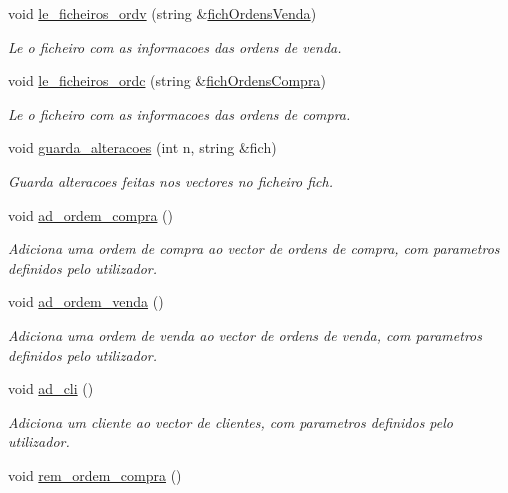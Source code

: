 \begin{DoxyCompactItemize}
void \hyperlink{class_bolsa_ab0cd2fab3d7490d5d4a431e5cb1106e6}{le\+\_\+ficheiros\+\_\+ordv} (string \&\hyperlink{_utils_8h_ad22902af7efe6d185550055b7caa5cbb}{fich\+Ordens\+Venda})
\begin{DoxyCompactList}\small\item\em Le o ficheiro com as informacoes das ordens de venda. \end{DoxyCompactList}\item 
void \hyperlink{class_bolsa_a57e3864eac22b2690e04fb8be39b5e58}{le\+\_\+ficheiros\+\_\+ordc} (string \&\hyperlink{_utils_8h_acaee3ba642d3be244820a97e5eb5b7f7}{fich\+Ordens\+Compra})
\begin{DoxyCompactList}\small\item\em Le o ficheiro com as informacoes das ordens de compra. \end{DoxyCompactList}\item 
void \hyperlink{class_bolsa_a12c0a8faf58b0803228ed17022c6ecfe}{guarda\+\_\+alteracoes} (int n, string \&fich)
\begin{DoxyCompactList}\small\item\em Guarda alteracoes feitas nos vectores no ficheiro fich. \end{DoxyCompactList}\item 
void \hyperlink{class_bolsa_a6567e62d4d1037ca2e2263ba7e22ea4e}{ad\+\_\+ordem\+\_\+compra} ()
\begin{DoxyCompactList}\small\item\em Adiciona uma ordem de compra ao vector de ordens de compra, com parametros definidos pelo utilizador. \end{DoxyCompactList}\item 
void \hyperlink{class_bolsa_ab028d3fd8537fa65b25c7eece82dfabc}{ad\+\_\+ordem\+\_\+venda} ()
\begin{DoxyCompactList}\small\item\em Adiciona uma ordem de venda ao vector de ordens de venda, com parametros definidos pelo utilizador. \end{DoxyCompactList}\item 
void \hyperlink{class_bolsa_a8bcc217341ffe40e4f2b6d7454977d4d}{ad\+\_\+cli} ()
\begin{DoxyCompactList}\small\item\em Adiciona um cliente ao vector de clientes, com parametros definidos pelo utilizador. \end{DoxyCompactList}\item 
void \hyperlink{class_bolsa_a831836b62c66324d7eaf4c71a4e8015e}{rem\+\_\+ordem\+\_\+compra} ()

\end{DoxyCompactItemize}
